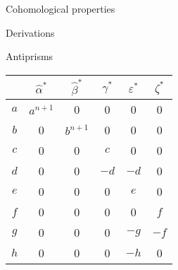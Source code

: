 \begin{chapter}{Cohomological properties}
\begin{section}{Derivations}
\begin{subsection}{Antiprisms}
\begin{center}
\begin{tabular}{ c | c | c | c | c | c }
	& $\hat\alpha^*$ 		& $\hat\beta^*$	& $\gamma^*$	& $\varepsilon^*$	& $\zeta^*$\\
\hline
$a$ & 	$a^{n+1}$ 			& 0			& 0			& 0 			& 0 \\
$b$ & 	0 				& $b^{n+1}$	& 0			& 0 			& 0 \\
$c$ & 	0 				& 0			& $c$			& 0 			& 0 \\
$d$ & 	0				& 0			& $-d$		& $-d$ 		& 0 \\ 
$e$ & 	0				& 0			& 0			& $e$ 			& 0 \\
$f$ & 	0				& 0			& 0			& 0 			& $f$ \\
$g$ & 	0				& 0			& 0			& $-g$		& $-f$ \\
$h$ & 	0				& 0			& 0			& $-h$		& 0 
\end{tabular}
\end{center}
\end{subsection}
\end{section}
\end{chapter}